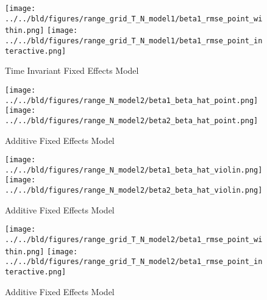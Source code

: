 \documentclass[a4paper]{article}
\begin{document}
\clearpage

\begin{figure}[h]
\centering
\texttt{[image: ../../bld/figures/range\_grid\_T\_N\_model1/beta1\_rmse\_point\_within.png]}
\centering
\texttt{[image: ../../bld/figures/range\_grid\_T\_N\_model1/beta1\_rmse\_point\_interactive.png]}
\centering
\caption{Time Invariant Fixed Effects Model}
\label{figure:figure3}
\end{figure}


\clearpage



\begin{figure}[h]
\centering
\texttt{[image: ../../bld/figures/range\_N\_model2/beta1\_beta\_hat\_point.png]}
\centering
\texttt{[image: ../../bld/figures/range\_N\_model2/beta2\_beta\_hat\_point.png]}
\centering
\caption{Additive Fixed Effects Model}
\label{figure:figure4}
\end{figure}

\clearpage

\begin{figure}[h]
\centering
\texttt{[image: ../../bld/figures/range\_N\_model2/beta1\_beta\_hat\_violin.png]}
\centering
\texttt{[image: ../../bld/figures/range\_N\_model2/beta2\_beta\_hat\_violin.png]}
\centering
\caption{Additive Fixed Effects Model}
\label{figure:figure5}
\end{figure}

\clearpage

\begin{figure}[h]
\centering
\texttt{[image: ../../bld/figures/range\_grid\_T\_N\_model2/beta1\_rmse\_point\_within.png]}
\centering
\texttt{[image: ../../bld/figures/range\_grid\_T\_N\_model2/beta1\_rmse\_point\_interactive.png]}
\centering
\caption{Additive Fixed Effects Model}
\label{figure:figure6}
\end{figure}
\end{document}
